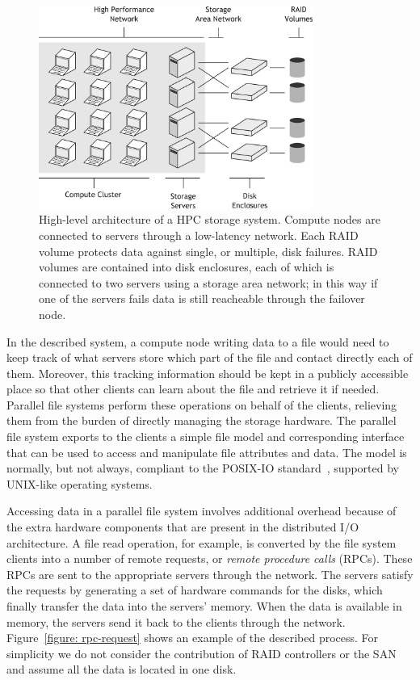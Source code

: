 \begin{figure}[!htb]
\centering
\includegraphics[width=0.8\textwidth]{figures/hpc-io-arch}
\caption{High-level architecture of a HPC storage system. Compute nodes are connected to servers through a low-latency network. Each RAID volume protects data against single, or multiple, disk failures. RAID volumes are
contained into disk enclosures, each of which is connected to two servers using a storage area network; in this way if one of the servers fails data is still reacheable through the failover node.}
\label{figure: hpc-io-arch}
\end{figure}

In the described system, a compute node writing data to a file would need to keep track of what servers store which part of the file and contact directly each of them. Moreover, this tracking information should be 
kept in a publicly accessible place so that other clients can learn about the file and retrieve it if needed. Parallel file systems perform these operations on behalf of the clients, relieving them from the burden 
of directly managing the storage hardware. The parallel file system exports to the clients a simple file model and corresponding interface that can be used to access and manipulate file attributes and data. The model 
is normally, but not always, compliant to the POSIX-IO standard~\cite{POSIX}, supported by UNIX-like operating systems.

Accessing data in a parallel file system involves additional overhead because of the extra hardware components that are present in the distributed I/O architecture. A file read operation, for example, is converted by 
the file system clients into a number of remote requests, or \textit{remote procedure calls} (RPCs). These RPCs are sent to the appropriate servers through the network. The servers satisfy the requests by generating a 
set of hardware commands for the disks, which finally transfer the data into the servers' memory. When the data is available in memory, the servers send it back to the clients through the network. 
Figure~\ref{figure: rpc-request} shows an example of the described process. For simplicity we do not consider the contribution of RAID controllers or the SAN and assume all the data is located in one disk.

